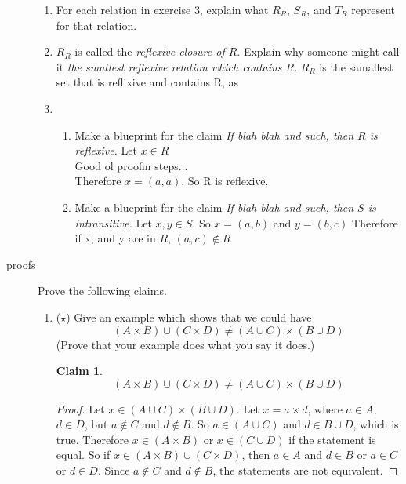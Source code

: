 \documentclass[11pt]{letter}
\newtheorem{claim}{Claim}
\theoremstyle{definition}
\begin{document}
\begin{description}
\begin{enumerate}
			\item  For each relation in exercise 3, explain what $R_R$, $S_R$, and $T_R$ represent for that relation.
			
			\item $R_R$ is called the {\em reflexive closure of $R$}. Explain why someone might call it {\em the smallest reflexive relation which contains $R$}. $R_R$ is the samallest set that is reflixive and contains R, as 
			
			\item \begin{enumerate}
			\item Make a blueprint for the claim {\em If blah blah and such, then $R$ is reflexive.}
                          Let $x\in R$\\
                          Good ol proofin steps...\\
                          Therefore $x=(a,a)$.
                          So R is reflexive.
			\item Make a blueprint for the claim  {\em If blah blah and such, then $S$ is intransitive.}
                          Let $x,y\in S$. So $x=(a,b)$ and $y=(b,c)$
                          Therefore if x, and y are in $R$, $(a,c)\notin R$
                          
			\end{enumerate}
	\end{enumerate}
	
		\item[proofs] Prove the following claims. 
		
		\begin{enumerate}
		\item ($\star$) Give an example which shows that we could have $$\left(A\times B\right)\cup\left(C\times D\right)\neq\left(A\cup C\right)\times\left(B\cup D\right)$$(Prove that your example does what you say it does.)
                  \begin{claim}
                    $$\left(A\times B\right)\cup\left(C\times D\right)\neq\left(A\cup C\right)\times\left(B\cup D\right)$$
                  \end{claim}
                  \begin{proof}
                    Let $x\in \left(A\cup C\right)\times\left(B\cup D\right)$. Let $x=a\times d$, where $a\in A$, $d\in D$, but $a\notin C$ and $d\notin B$. So $a\in(A\cup C)$ and $d\in B\cup D$, which is true. Therefore $x\in (A\times B)$ or $x\in (C\cup D)$ if the statement is equal. So if $x\in \left(A\times B\right)\cup\left(C\times D\right)$, then $a\in A$ and $d\in B$ or $a\in C$ or $d\in D$. Since $a\notin C$ and $d \notin B$, the statements are not equivalent.
                  \end{proof}
                  

\end{enumerate}
\end{description}
\end{document}
